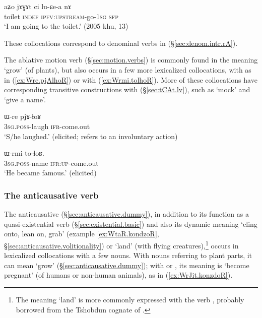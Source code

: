  \begin{exe}
	\ex \label{ex:jAGAt.luCea}
	\gll  aʑo jɤɣɤt ci lu-ɕe-a nɤ \\
		 toilet \textsc{indef} \textsc{ipfv}:\textsc{upstream}-go-\textsc{1sg} \textsc{sfp} \\
	\glt `I am going to the toilet.' (2005 khu, 13) 
\end{exe}

These collocations correspond to denominal verbs in  (§\ref{sec:denom.intr.rA}).


The ablative motion verb  (§\ref{sec:motion.verbs}) is commonly found in the meaning `grow' (of plants), but also occurs in a few more lexicalized collocations, with  as in (\ref{ex:Wre.pjAlhoR}) or with  (\ref{ex:Wrmi.tolhoR}). More of these collocations have corresponding transitive constructions with  (§\ref{sec:tCAt.lv}), such as  `mock' and  `give a name'.

\begin{exe}
\ex \label{ex:Wre.pjAlhoR}
\gll ɯ-re pjɤ-ɬoʁ \\
\textsc{3sg}.\textsc{poss}-laugh \textsc{ifr}-come.out \\
\glt `S/he laughed.' (elicited; refers to an involuntary action)
\end{exe}

\begin{exe}
\ex \label{ex:Wrmi.tolhoR}
\gll ɯ-rmi to-ɬoʁ. \\
\textsc{3sg}.\textsc{poss}-name \textsc{ifr}:\textsc{up}-come.out \\
\glt `He became famous.' (elicited)
\end{exe}

 \subsubsection{The anticausative verb } \label{sec:ndzoR.light.verbs}
The anticausative  (§\ref{sec:anticausative.dummy}), in addition to its function as a quasi-existential verb (§\ref{sec:existential.basic}) and also its dynamic meaning  `cling onto, lean on, grab' (example \ref{ex:WtaR.kondzoR}, §\ref{sec:anticausative.volitionality}) or `land' (with flying creatures),\footnote{The meaning `land' is more commonly expressed with the verb , probably borrowed from the Tshobdun cognate of . } occurs in lexicalized collocations with a few nouns.  With nouns referring to  plant parts, it can mean `grow' (§\ref{sec:anticausative.dummy}); with  or , its meaning is `become pregnant' (of humans or non-human animals), as in (\ref{ex:WrJit.konzdoR}).

